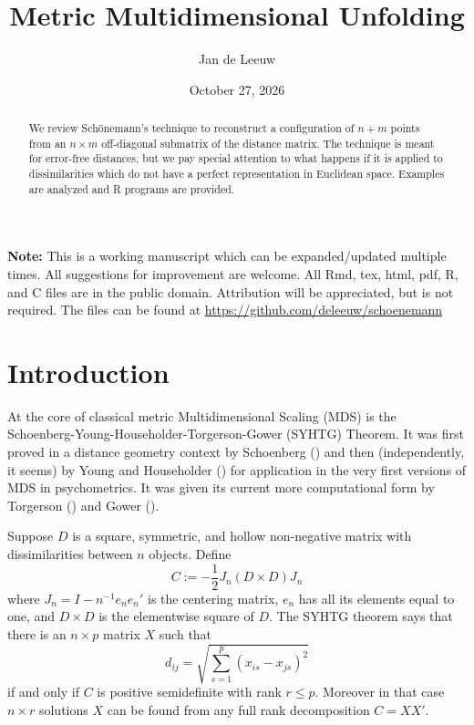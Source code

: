 \documentclass[
  12pt,
  letterpaper,
  DIV=11,
  numbers=noendperiod]{scrartcl}
\title{Metric Multidimensional Unfolding}
\author{Jan de Leeuw}
\date{October 27, 2026}
\newcommand{\sectionbreak}{\clearpage}
\renewcommand*\contentsname{Table of contents}
\newcommand\contentsname{Table of contents}
\begin{document}
\maketitle
\begin{abstract}
We review Schönemann's technique to reconstruct a configuration of
\(n+m\) points from an \(n\times m\) off-diagonal submatrix of the
distance matrix. The technique is meant for error-free distances, but we
pay special attention to what happens if it is applied to
dissimilarities which do not have a perfect representation in Euclidean
space. Examples are analyzed and R programs are provided.
\end{abstract}

\renewcommand*\contentsname{Table of contents}
{
\setcounter{tocdepth}{3}
\tableofcontents
}

\sectionbreak

\textbf{Note:} This is a working manuscript which can be
expanded/updated multiple times. All suggestions for improvement are
welcome. All Rmd, tex, html, pdf, R, and C files are in the public
domain. Attribution will be appreciated, but is not required. The files
can be found at \url{https://github.com/deleeuw/schoenemann}

\sectionbreak

\section{Introduction}\label{introduction}

At the core of classical metric Multidimensional Scaling (MDS) is the
Schoenberg-Young-Householder-Torgerson-Gower (SYHTG) Theorem. It was
first proved in a distance geometry context by Schoenberg
() and then (independently, it seems)
by Young and Householder () for
application in the very first versions of MDS in psychometrics. It was
given its current more computational form by Torgerson
() and Gower
().

Suppose \(D\) is a square, symmetric, and hollow non-negative matrix
with dissimilarities between \(n\) objects. Define \begin{equation}
  C := -\frac12 J_n(D \times D)J_n
\end{equation} where \(J_n = I - n^{-1}e_ne_n'\) is the centering
matrix, \(e_n\) has all its elements equal to one, and \(D \times D\) is
the elementwise square of \(D\). The SYHTG theorem says that there is an
\(n \times p\) matrix \(X\) such that \begin{equation}
  d_{ij} = \sqrt{\sum_{s=1}^p(x_{is} - x_{js})^2}
\end{equation} if and only if \(C\) is positive semidefinite with rank
\(r \leq p\). Moreover in that case \(n \times r\) solutions \(X\) can
be found from any full rank decomposition \(C = XX'\).
\end{document}
